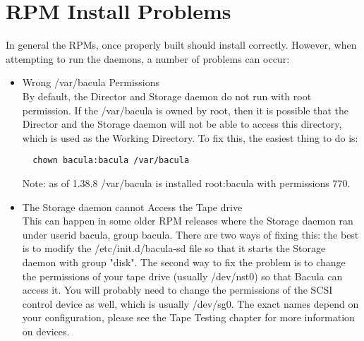 \section{RPM Install Problems}
In general the RPMs, once properly built should install correctly.
However, when attempting to run the daemons, a number of problems
can occur:
\begin{itemize}
\item Wrong /var/bacula Permissions \\
  By default, the Director and Storage daemon do not run with
  root permission. If the /var/bacula is owned by root, then it
  is possible that the Director and the Storage daemon will not
  be able to access this directory, which is used as the Working
  Directory. To fix this, the easiest thing to do is:
\begin{verbatim}
  chown bacula:bacula /var/bacula
\end{verbatim}
  Note: as of 1.38.8 /var/bacula is installed root:bacula with
  permissions 770.
\item The Storage daemon cannot Access the Tape drive \\
  This can happen in some older RPM releases where the Storage
  daemon ran under userid bacula, group bacula.  There are two
  ways of fixing this: the best is to modify the /etc/init.d/bacula-sd
  file so that it starts the Storage daemon with group "disk".
  The second way to fix the problem is to change the permissions
  of your tape drive (usually /dev/nst0) so that Bacula can access it.
  You will probably need to change the permissions of the SCSI control
  device as well, which is usually /dev/sg0.  The exact names depend
  on your configuration, please see the Tape Testing chapter for
  more information on devices.
\end{itemize}
 
